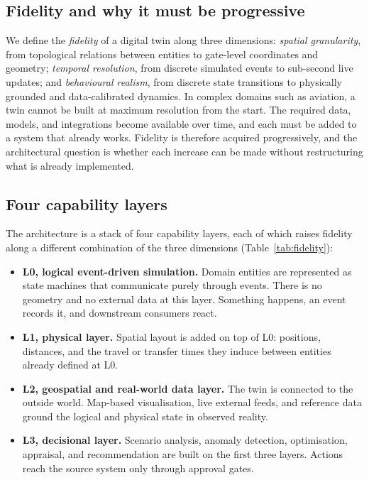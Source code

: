 \documentclass[runningheads]{llncs}
\begin{document}
\subsection{Fidelity and why it must be progressive}

We define the \emph{fidelity} of a digital twin along three dimensions: \emph{spatial granularity}, from topological relations between entities to gate-level coordinates and geometry; \emph{temporal resolution}, from discrete simulated events to sub-second live updates; and \emph{behavioural realism}, from discrete state transitions to physically grounded and data-calibrated dynamics. In complex domains such as aviation, a twin cannot be built at maximum resolution from the start. The required data, models, and integrations become available over time, and each must be added to a system that already works. Fidelity is therefore acquired progressively, and the architectural question is whether each increase can be made without restructuring what is already implemented.

\subsection{Four capability layers}

The architecture is a stack of four capability layers, each of which raises fidelity along a different combination of the three dimensions (Table~\ref{tab:fidelity}):

\begin{itemize}
  \item \textbf{L0, logical event-driven simulation.} Domain entities are represented as state machines that communicate purely through events. There is no geometry and no external data at this layer. Something happens, an event records it, and downstream consumers react.
  \item \textbf{L1, physical layer.} Spatial layout is added on top of L0: positions, distances, and the travel or transfer times they induce between entities already defined at L0.
  \item \textbf{L2, geospatial and real-world data layer.} The twin is connected to the outside world. Map-based visualisation, live external feeds, and reference data ground the logical and physical state in observed reality.
  \item \textbf{L3, decisional layer.} Scenario analysis, anomaly detection, optimisation, appraisal, and recommendation are built on the first three layers. Actions reach the source system only through approval gates.
\end{itemize}
\end{document}
